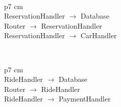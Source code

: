     \\
    \begin{tabular}{ p{7 cm} }
      \hline
       \\
      \hline
      ReservationHandler $ \rightarrow $ Database \\ \hline
      Router $ \rightarrow $ ReservationHandler \\ \hline
      ReservationHandler $ \rightarrow $ CarHandler \\ \hline
      \vspace{1mm}
    \end{tabular}
    \\
    \begin{tabular}{ p{7 cm} }
      \hline
       \\
      \hline
      RideHandler $ \rightarrow $ Database \\ \hline
      Router $ \rightarrow $ RideHandler \\ \hline
      RideHandler $ \rightarrow $ PaymentHandler \\ \hline
      \vspace{1mm}
    \end{tabular}

